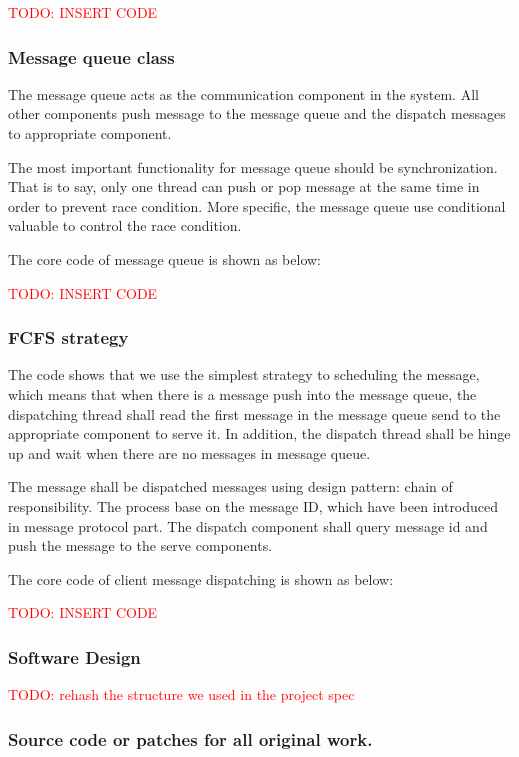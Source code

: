 \documentclass[11pt,a4paper,titlepage]{report}
\begin{document}
\textcolor{red}{TODO: INSERT CODE}


\subsubsection{Message queue class}

The message queue acts as the communication component in the system. All other components push message to the message queue and the dispatch messages to appropriate component. 

The most important functionality for message queue should be synchronization. That is to say, only one thread can push or pop message at the same time in order to prevent race condition. More specific, the message queue use conditional valuable to control the race condition. 

The core code of message queue is shown as below:

\textcolor{red}{TODO: INSERT CODE}


\subsubsection{FCFS strategy}

The code shows that we use the simplest strategy to scheduling the message, which means that when there is a message push into the message queue, the dispatching thread shall read the first message in the message queue send to the appropriate component to serve it. In addition, the dispatch thread shall be hinge up and wait when there are no messages in message queue.

The message shall be dispatched messages using design pattern: chain of responsibility. The process base on the message ID, which have been introduced in message protocol part. The dispatch component shall query message id and push the message to the serve components.

The core code of client message dispatching is shown as below:

\textcolor{red}{TODO: INSERT CODE}





\subsubsection{Software Design}

\textcolor{red}{TODO: rehash the structure we used in the project spec}


\subsubsection{Source code or patches for all original work.}
\end{document}
